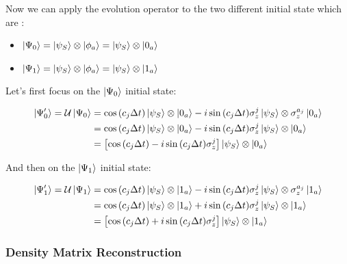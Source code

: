 \documentclass[a4paper,12pt]{article}
\begin{document}
	\newpage
	
	\begin{flushleft}
		Now we can apply the evolution operator to the two different initial state which are :
	\end{flushleft}
	
	\begin{itemize}
		\item $ \ket{\Psi_{0}} = \ket{\psi_S} \otimes \ket{\phi_a} = \ket{\psi_S} \otimes  \ket{0_a} $ \\
		\item $ \ket{\Psi_{1}} = \ket{\psi_S} \otimes \ket{\phi_a} = \ket{\psi_S} \otimes  \ket{1_a} $
	\end{itemize} 
	
	Let's first focus on the $ \ket{\Psi_{0}} $ initial state:
	
	\begin{align}
		\ket{\Psi'_{0}} = \mathcal{U} \ket{\Psi_{0}}
		&= \cos{\left(c_j \Delta t\right)} \ket{\psi_{S}} \otimes \ket{0_a} - i\sin{\left(c_j \Delta t \right)} \sigma_{z}^{j} \ket{\psi_{S}} \otimes \sigma_{z}^{a_j}\ket{0_a} \notag \\
		&= \cos{\left(c_j \Delta t\right)} \ket{\psi_{S}} \otimes \ket{0_a} - i\sin{\left(c_j \Delta t \right)} \sigma_{z}^{j} \ket{\psi_{S}} \otimes \ket{0_a} \notag \\
		&= \left[\cos{\left(c_j \Delta t\right)} - i\sin{\left(c_j \Delta t \right)} \sigma_{z}^{j} \right] \ket{\psi_{S}} \otimes \ket{0_a}
	\end{align}
	
	And then on the $ \ket{\Psi_{1}} $ initial state:
	
	\begin{align}
		\ket{\Psi'_{1}} = \mathcal{U} \ket{\Psi_{1}}
		&= \cos{\left(c_j \Delta t\right)} \ket{\psi_{S}} \otimes \ket{1_a} - i\sin{\left(c_j \Delta t \right)} \sigma_{z}^{j} \ket{\psi_{S}} \otimes \sigma_{z}^{a_j}\ket{1_a} \notag \\
		&= \cos{\left(c_j \Delta t\right)} \ket{\psi_{S}} \otimes \ket{1_a} + i\sin{\left(c_j \Delta t \right)} \sigma_{z}^{j} \ket{\psi_{S}} \otimes \ket{1_a} \notag \\
		&= \left[\cos{\left(c_j \Delta t\right)} + i\sin{\left(c_j \Delta t \right)} \sigma_{z}^{j} \right] \ket{\psi_{S}} \otimes \ket{1_a}
	\end{align}
	
	\subsubsection{Density Matrix Reconstruction}
	
\end{document}
